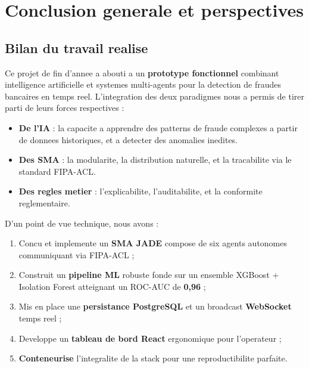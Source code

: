 \documentclass[12pt,a4paper,oneside]{report}
\begin{document}
\chapter*{Conclusion generale et perspectives}

\section*{Bilan du travail realise}

Ce projet de fin d'annee a abouti a un \textbf{prototype fonctionnel}
combinant intelligence artificielle et systemes multi-agents pour la
detection de fraudes bancaires en temps reel. L'integration des deux
paradigmes nous a permis de tirer parti de leurs forces respectives :

\begin{itemize}[leftmargin=*]
  \item \textbf{De l'IA} : la capacite a apprendre des patterns de fraude
        complexes a partir de donnees historiques, et a detecter des
        anomalies inedites.
  \item \textbf{Des SMA} : la modularite, la distribution naturelle, et la
        tracabilite via le standard FIPA-ACL.
  \item \textbf{Des regles metier} : l'explicabilite, l'auditabilite, et la
        conformite reglementaire.
\end{itemize}

D'un point de vue technique, nous avons :
\begin{enumerate}[leftmargin=*]
  \item Concu et implemente un \textbf{SMA JADE} compose de six agents
        autonomes communiquant via FIPA-ACL ;
  \item Construit un \textbf{pipeline ML} robuste fonde sur un ensemble
        XGBoost + Isolation Forest atteignant un ROC-AUC de \textbf{0,96} ;
  \item Mis en place une \textbf{persistance PostgreSQL} et un broadcast
        \textbf{WebSocket} temps reel ;
  \item Developpe un \textbf{tableau de bord React} ergonomique pour
        l'operateur ;
  \item \textbf{Conteneurise} l'integralite de la stack pour une
        reproductibilite parfaite.
\end{enumerate}
\end{document}
